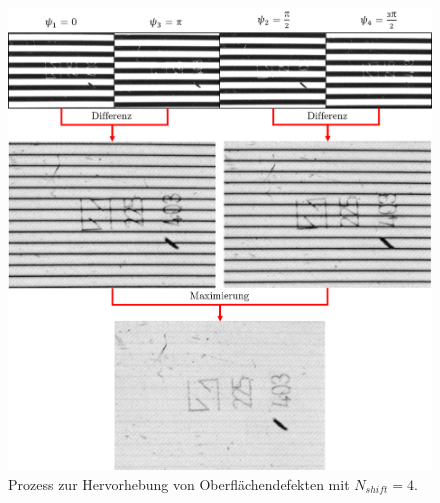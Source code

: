 \begin{figure}[H]
	\centering
	\includegraphics[width=\textwidth]{03_sichtpruefungDurchLichtstreuung/optimierungen/figures/imageTree}
	\caption[Prozess der Hervorhebung von Oberflächendefekten]{Prozess zur Hervorhebung von Oberflächendefekten mit $N_{shift} = 4$.}
	\label{img:imageTree}
\end{figure}